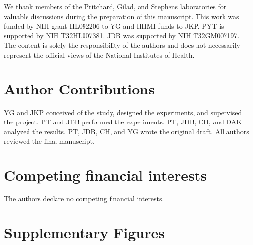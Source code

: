 We thank members of the Pritchard, Gilad, and Stephens laboratories for
valuable discussions during the preparation of this manuscript. This
work was funded by NIH grant HL092206 to YG and HHMI funds to JKP. PYT
is supported by NIH T32HL007381. JDB was supported by NIH T32GM007197.
The content is solely the responsibility of the authors and does not
necessarily represent the official views of the National Institutes of
Health.

\section{Author Contributions}\label{author-contributions}

YG and JKP conceived of the study, designed the experiments, and
supervised the project. PT and JEB performed the experiments. PT, JDB,
CH, and DAK analyzed the results. PT, JDB, CH, and YG wrote the original
draft. All authors reviewed the final manuscript.

\section{Competing financial
interests}\label{competing-financial-interests}

The authors declare no competing financial interests.

\section{Supplementary Figures}\label{supplementary-figures}

